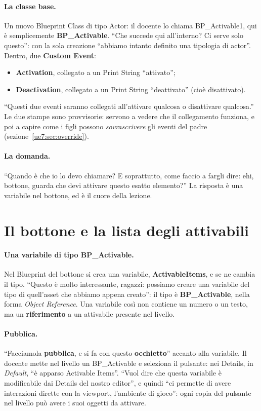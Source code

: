 \paragraph{La classe base.} Un nuovo Blueprint Class di tipo Actor: il docente lo chiama
BP\_Activable1, qui è semplicemente \textbf{BP\_Activable}. ``Che succede qui all'interno? Ci serve solo
questo'': con la sola creazione ``abbiamo intanto definito una tipologia di actor''.
Dentro, due \textbf{Custom Event}:
\begin{itemize}
  \item \textbf{Activation}, collegato a un Print String ``attivato'';
  \item \textbf{Deactivation}, collegato a un Print String ``deattivato'' (cioè
        disattivato).
\end{itemize}
``Questi due eventi saranno collegati all'attivare qualcosa o disattivare qualcosa.'' Le
due stampe sono provvisorie: servono a vedere che il collegamento funziona, e poi a
capire come i figli possono \emph{sovrascrivere} gli eventi del padre
(sezione~\ref{ue7:sec:override}).

\paragraph{La domanda.} ``Quando è che io lo devo chiamare? E soprattutto, come faccio a
fargli dire: ehi, bottone, guarda che devi attivare questo esatto elemento?'' La risposta
è una variabile nel bottone, ed è il cuore della lezione.

\section{Il bottone e la lista degli attivabili}
\label{ue7:sec:array}

\paragraph{Una variabile di tipo BP\_Activable.} Nel Blueprint del bottone si crea una
variabile, \textbf{ActivableItems}, e se ne cambia il tipo. ``Questo è molto
interessante, ragazzi: possiamo creare una variabile del tipo di quell'asset che abbiamo
appena creato'': il tipo è \textbf{BP\_Activable}, nella forma \emph{Object Reference}.
Una variabile così non contiene un numero o un testo, ma un \textbf{riferimento} a un
attivabile presente nel livello.

\paragraph{Pubblica.} ``Facciamola \textbf{pubblica}, e si fa con questo
\textbf{occhietto}'' accanto alla variabile. Il docente mette nel livello un
BP\_Activable e seleziona il pulsante: nei Details, in \emph{Default}, ``è apparso
Activable Items''. ``Vuol dire che questa variabile è modificabile dai Details del nostro
editor'', e quindi ``ci permette di avere interazioni dirette con la viewport,
l'ambiente di gioco'': ogni copia del pulsante nel livello può avere i suoi oggetti da
attivare.

